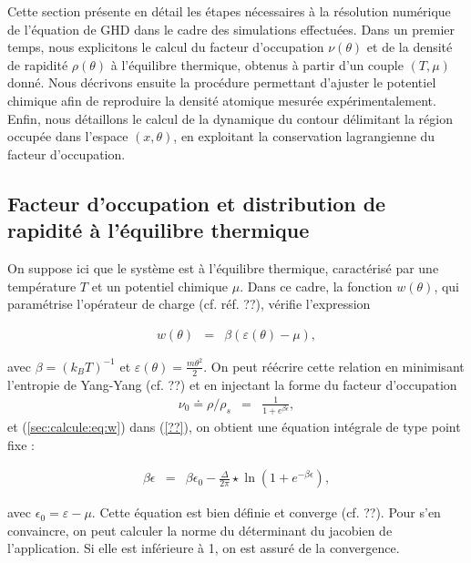 \label{sec:calcule}
Cette section présente en détail les étapes nécessaires à la résolution numérique de l’équation de GHD dans le cadre des simulations effectuées. Dans un premier temps, nous explicitons le calcul du facteur d’occupation $\nu(\theta)$ et de la densité de rapidité $\rho(\theta)$ à l’équilibre thermique, obtenus à partir d’un couple $(T, \mu)$ donné. Nous décrivons ensuite la procédure permettant d’ajuster le potentiel chimique afin de reproduire la densité atomique mesurée expérimentalement. Enfin, nous détaillons le calcul de la dynamique du contour délimitant la région occupée dans l’espace $(x, \theta)$, en exploitant la conservation lagrangienne du facteur d’occupation.

\subsection{Facteur d’occupation et distribution de rapidité à l’équilibre thermique}

On suppose ici que le système est à l’équilibre thermique, caractérisé par une température $T$ et un potentiel chimique $\mu$. Dans ce cadre, la fonction $w(\theta)$, qui paramétrise l’opérateur de charge (cf. réf. ??), vérifie l’expression

\begin{eqnarray}
w(\theta) &=& \beta \left( \varepsilon(\theta) - \mu \right),
\label{sec:calcule:eq:w}
\end{eqnarray}

avec $\beta = (k_B T)^{-1}$ et $\varepsilon(\theta) = \frac{m \theta^2}{2}$. On peut réécrire cette relation en minimisant l'entropie de Yang-Yang (cf. ??) et en injectant la forme du facteur d'occupation 
\begin{eqnarray}
	\label{sec:calcule:eq:nu}
	\nu_0 \doteq \rho/\rho_s & = &  \frac{1}{1+e^{\beta \epsilon}},	
\end{eqnarray}
 et (\ref{sec:calcule:eq:w}) dans (\ref{??}), on obtient une équation intégrale de type point fixe  :

\begin{eqnarray*}
	\beta \epsilon & = & \beta \epsilon_0 -  \frac{\Delta}{2\pi} \star \ln \left( 1 + e^{-\beta \epsilon} \right) ,
\end{eqnarray*}

avec $\epsilon_0 = \varepsilon - \mu$. Cette équation est bien définie et converge (cf. ??). Pour s'en convaincre, on peut calculer la norme du déterminant du jacobien de l'application. Si elle est inférieure à 1, on est assuré de la convergence. 

